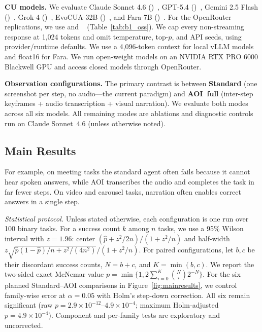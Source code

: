\documentclass[letterpaper]{article} %
\begin{document}
\textbf{CU models.}
We evaluate Claude Sonnet 4.6 ()~\citep{anthropic2024claude}, GPT-5.4 ()~\citep{openai2026gpt54}, Gemini 2.5 Flash ()~\citep{gemini25cu}, Grok-4 ()~\citep{xai2026grok4}, EvoCUA-32B ()~\citep{evocua}, and Fara-7B ()~\citep{fara7b}. For the OpenRouter replications, we use  and ~\citep{qwen3vl} (Table~\ref{tab:b1_oss}). We cap every non-streaming response at 1,024 tokens and omit temperature, top-$p$, and API seeds, using provider/runtime defaults. We use a 4,096-token context for local vLLM models and float16 for Fara. We run open-weight models on an NVIDIA RTX PRO 6000 Blackwell GPU and access closed models through OpenRouter.

\textbf{Observation configurations.}
The primary contrast is between \textbf{Standard} (one screenshot per step, no audio---the
current paradigm) and \textbf{AOI~full} (inter-step keyframes + audio
transcription + visual narration). We evaluate both modes across all six models.
All remaining modes are ablations and diagnostic controls run on Claude Sonnet~4.6
(unless otherwise noted).

\subsection{Main Results}
\label{sec:main-results}

For example, on meeting tasks the standard agent often fails because it cannot hear spoken answers, while AOI transcribes the audio and completes the task in far fewer steps. On video and carousel tasks, narration often enables correct answers in a single step.

\emph{Statistical protocol.}
Unless stated otherwise, each configuration is one run over 100 binary tasks. For a success count $k$ among $n$ tasks, we use a 95\% Wilson interval with $z=1.96$: center $(\hat p+z^2/2n)/(1+z^2/n)$ and half-width $z\sqrt{\hat p(1-\hat p)/n+z^2/(4n^2)}/(1+z^2/n)$. For paired configurations, let $b,c$ be their discordant success counts, $N=b+c$, and $K=\min(b,c)$. We report the two-sided exact McNemar value $p=\min\{1,2\sum_{i=0}^{K}\binom{N}{i}2^{-N}\}$. For the six planned Standard--AOI comparisons in Figure~\ref{fig:mainresults}, we control family-wise error at $\alpha=0.05$ with Holm's step-down correction. All six remain significant (raw $p=2.9\!\times\!10^{-12}$--$4.9\!\times\!10^{-4}$; maximum Holm-adjusted $p=4.9\!\times\!10^{-4}$). Component and per-family tests are exploratory and uncorrected.
\end{document}

